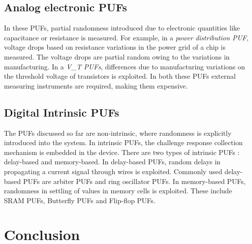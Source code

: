 \subsection{Analog electronic PUFs}
In these PUFs, partial randomness introduced due to electronic quantities like capacitance or 
resistance is measured. 
For example, in a \textit{power distribution PUF}, voltage drops based on resistance variations
in the power grid of a chip is measured. The voltage drops are partial random owing to the
variations in manufacturing. In a \textit{V\_T PUFs}, differences due to manufacturing variations
on the threshold voltage of transistors is exploited. In both these PUFs external measuring instruments
are required, making them expensive.


\subsection{Digital Intrinsic PUFs}
The PUFs discussed so far are non-intrinsic, where randomness is explicitly introduced into the
system. In intrinsic PUFs, the challenge response 
collection mechanism is embedded in the device. There are two types of intrinsic PUFs :
delay-based and memory-based. In delay-based PUFs, random delays in propagating a current signal
through wires is exploited. Commonly used delay-based PUFs are arbiter PUFs and ring oscillator 
PUFs. In memory-based PUFs, randomness in settling of values in memory cells is exploited. 
These include SRAM PUFs, Butterfly PUFs and Flip-flop PUFs.



\section{Conclusion}
